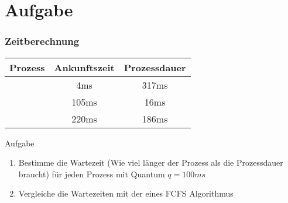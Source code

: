 \section{Aufgabe}

\begin{frame}
    \frametitle{Zeitberechnung}

    \begin{table}[]
        \begin{tabular}{c|c|c}
            \textbf{Prozess} & \textbf{Ankunftszeit} & \textbf{Prozessdauer} \\
            \hline{}
            \PZero{}         & 4ms                   & 317ms                 \\
            \POne{}          & 105ms                 & 16ms                  \\
            \PTwo{}          & 220ms                 & 186ms
        \end{tabular}
    \end{table}

    \begin{block}{Aufgabe}
        \begin{enumerate}
            \item Bestimme die Wartezeit (Wie viel l{\"a}nger der Prozess als die Prozessdauer braucht) f{\"u}r jeden Prozess mit Quantum $q = 100ms$
            \item Vergleiche die Wartezeiten mit der eines FCFS Algorithmus
        \end{enumerate}
    \end{block}

\end{frame}

